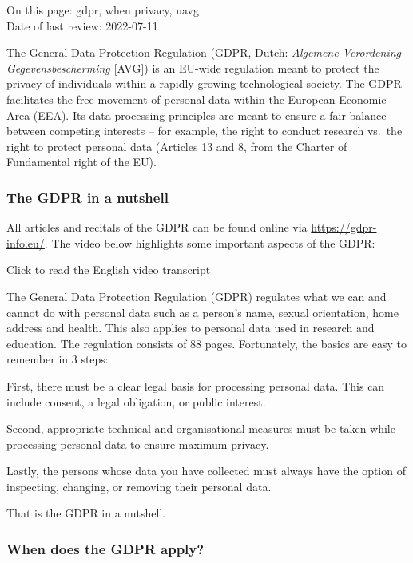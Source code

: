 \documentclass[
]{book}
\begin{document}
On this page: gdpr, when privacy, uavg\\
Date of last review: 2022-07-11

The General Data Protection Regulation (GDPR, Dutch: \emph{Algemene Verordening
Gegevensbescherming} {[}AVG{]}) is an EU-wide regulation meant to protect the privacy
of individuals within a rapidly growing technological society. The GDPR facilitates
the free movement of personal data within the European Economic Area (EEA). Its
data processing principles are meant to ensure a fair balance between competing
interests -- for example, the right to conduct research vs.~the right to protect
personal data (Articles 13 and 8, from the Charter of Fundamental right of the EU).

\hypertarget{the-gdpr-in-a-nutshell}{%
\subsubsection{The GDPR in a nutshell}\label{the-gdpr-in-a-nutshell}}

All articles and recitals of the GDPR can be found online via \url{https://gdpr-info.eu/}.
The video below highlights some important aspects of the GDPR:

Click to read the English video transcript

The General Data Protection Regulation (GDPR) regulates what we can
and cannot do with personal data such as a person's name, sexual orientation,
home address and health. This also applies to personal data used in research
and education. The regulation consists of 88 pages. Fortunately, the basics
are easy to remember in 3 steps:

First, there must be a clear legal basis for processing personal data. This can
include consent, a legal obligation, or public interest.

Second, appropriate technical and organisational measures must be taken
while processing personal data to ensure maximum privacy.

Lastly, the persons whose data you have collected must always have the
option of inspecting, changing, or removing their personal data.

That is the GDPR in a nutshell.

\hypertarget{gdpr-scope}{%
\subsubsection{When does the GDPR apply?}\label{gdpr-scope}}
\end{document}
